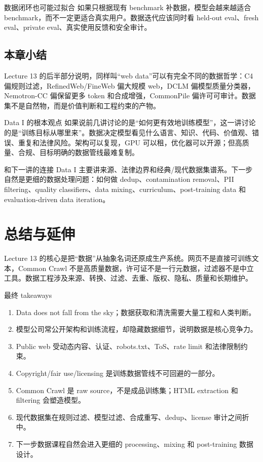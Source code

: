 \documentclass[a4paper]{article}
\begin{document}
\begin{warningbox}{数据闭环也可能过拟合}
如果只根据现有 benchmark 补数据，模型会越来越适合 benchmark，而不一定更适合真实用户。数据迭代应该同时看 held-out eval、fresh eval、private eval、真实使用反馈和安全审计。
\end{warningbox}

\subsection{本章小结}

Lecture 13 的后半部分说明，同样叫“web data”可以有完全不同的数据哲学：C4 偏规则过滤，RefinedWeb/FineWeb 偏大规模 web，DCLM 偏模型质量分类器，Nemotron-CC 偏保留更多 token 和合成增强，CommonPile 偏许可可审计。数据集不是自然物，而是价值判断和工程约束的产物。

\begin{importantbox}{Data I 的根本观点}
如果说前几讲讨论的是“如何更有效地训练模型”，这一讲讨论的是“训练目标从哪里来”。数据决定模型看见什么语言、知识、代码、价值观、错误、重复和法律风险。架构可以复现，GPU 可以租，优化器可以开源；但高质量、合规、目标明确的数据管线最难复制。
\end{importantbox}

\begin{knowledgebox}{和下一讲的连接}
Data I 主要讲来源、法律边界和经典/现代数据集谱系。下一步自然是更细的数据处理问题：如何做 dedup、contamination removal、PII filtering、quality classifiers、data mixing、curriculum、post-training data 和 evaluation-driven data iteration。
\end{knowledgebox}

\section{总结与延伸}

Lecture 13 的核心是把“数据”从抽象名词还原成生产系统。网页不是直接可训练文本，Common Crawl 不是高质量数据，许可证不是一行元数据，过滤器不是中立工具。数据工程涉及来源、转换、过滤、去重、版权、隐私、质量和长期维护。

\begin{importantbox}{最终 takeaways}
\begin{enumerate}
    \item Data does not fall from the sky；数据获取和清洗需要大量工程和人类判断。
    \item 模型公司常公开架构和训练流程，却隐藏数据细节，说明数据是核心竞争力。
    \item Public web 受动态内容、认证、robots.txt、ToS、rate limit 和法律限制约束。
    \item Copyright/fair use/licensing 是训练数据管线不可回避的一部分。
    \item Common Crawl 是 raw source，不是成品训练集；HTML extraction 和 filtering 会塑造模型。
    \item 现代数据集在规则过滤、模型过滤、合成重写、dedup、license 审计之间折中。
    \item 下一步数据课程自然会进入更细的 processing、mixing 和 post-training 数据设计。
\end{enumerate}
\end{importantbox}
\end{document}
